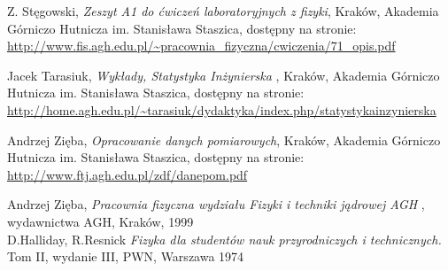 \documentclass{article}
\begin{document}
\begin{thebibliography}{9}
	
	Z. Stęgowski,
	\emph{Zeszyt A1 do ćwiczeń laboratoryjnych z fizyki}, Kraków, Akademia Górniczo Hutnicza im. Stanisława Staszica, dostępny na stronie:\\
	\url{http://www.fis.agh.edu.pl/\~pracownia\_fizyczna/cwiczenia/71\_opis.pdf}
	
	
	
	\bibitem[2]{}
	Jacek Tarasiuk,
	\emph{Wykłady, Statystyka Inżynierska} , Kraków, Akademia Górniczo Hutnicza im. Stanisława Staszica, dostępny na stronie:\\
	\url{http://home.agh.edu.pl/~tarasiuk/dydaktyka/index.php/statystykainzynierska}
	
	Andrzej Zięba,
	\emph{Opracowanie danych pomiarowych}, Kraków, Akademia Górniczo Hutnicza im. Stanisława Staszica, dostępny na stronie:\\
	\url{http://www.ftj.agh.edu.pl/zdf/danepom.pdf}
	\label{statystyka}
	
	Andrzej Zięba,
	\emph{Pracownia fizyczna wydziału Fizyki i techniki jądrowej AGH} , wydawnictwa AGH, Kraków, 1999\\
	
	
	D.Halliday, R.Resnick
	\emph{Fizyka dla studentów nauk przyrodniczych i technicznych.} Tom II, wydanie III, PWN, Warszawa 1974
	
\end{thebibliography}
\end{document}
